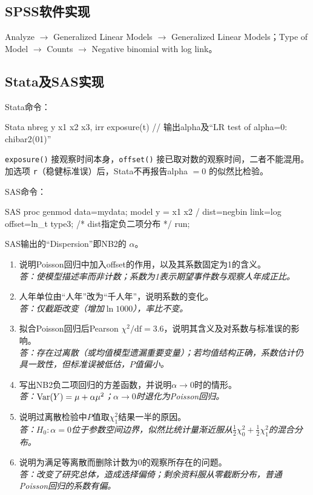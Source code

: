 \subsection{SPSS软件实现}
Analyze $\to$ Generalized Linear Models $\to$ Generalized Linear Models；Type of Model $\to$ Counts $\to$ Negative binomial with log link。
\subsection{Stata及SAS实现}
Stata命令：
\par\noindent\begin{minipage}{\linewidth}
\begin{coursecode}{Stata}
nbreg y x1 x2 x3, irr exposure(t)    // 输出alpha及“LR test of alpha=0: chibar2(01)”
\end{coursecode}
\texttt{exposure()} 接观察时间本身，\texttt{offset()} 接已取对数的观察时间，二者不能混用。加选项 \texttt{r}（稳健标准误）后，Stata不再报告alpha $=0$ 的似然比检验。
\end{minipage}\par
{}
SAS命令：
\par\noindent\begin{minipage}{\linewidth}
\begin{coursecode}{SAS}
proc genmod data=mydata;
  model y = x1 x2 / dist=negbin link=log offset=ln_t type3;   /* dist指定负二项分布 */
run;
\end{coursecode}
SAS输出的“Dispersion”即NB2的 $\alpha$。
\end{minipage}\par

\begin{fuxi}[复习题]
\begin{enumerate}
\item 说明Poisson回归中加入offset的作用，以及其系数固定为1的含义。\\
\textit{答：使模型描述率而非计数；系数为1表示期望事件数与观察人年成正比。}
\item 人年单位由“人年”改为“千人年”，说明系数的变化。\\
\textit{答：仅截距改变（增加$\ln1000$），率比不变。}
\item 拟合Poisson回归后Pearson $\chi^2/\mathrm{df}=3.6$，说明其含义及对系数与标准误的影响。\\
\textit{答：存在过离散（或均值模型遗漏重要变量）；若均值结构正确，系数估计仍具一致性，但标准误被低估，$P$值偏小。}
\item 写出NB2负二项回归的方差函数，并说明$\alpha\to0$时的情形。\\
\textit{答：$\operatorname{Var}(Y)=\mu+\alpha\mu^2$；$\alpha\to0$时退化为Poisson回归。}
\item 说明过离散检验中$P$值取$\chi^2_1$结果一半的原因。\\
\textit{答：$H_0:\alpha=0$位于参数空间边界，似然比统计量渐近服从$\frac12\chi^2_0+\frac12\chi^2_1$的混合分布。}
\item 说明为满足等离散而删除计数为0的观察所存在的问题。\\
\textit{答：改变了研究总体，造成选择偏倚；剩余资料服从零截断分布，普通Poisson回归的系数有偏。}
\end{enumerate}
\end{fuxi}
